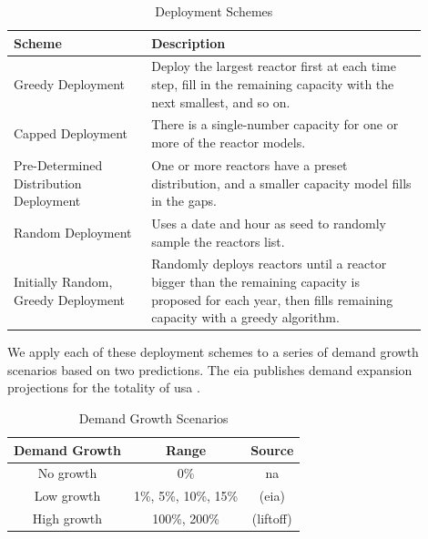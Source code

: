 \begin{table}[htbp]
    \centering
    \caption{Deployment Schemes}
    \label{tab:deployment_schemes}
    \begin{tabular}{p{0.3\linewidth} p{0.6\linewidth}}
        \hline
        \textbf{Scheme} & \textbf{Description} \\
        \hline
        Greedy Deployment & Deploy the largest reactor first at each time step, fill in the remaining capacity with the next smallest, and so on. \\
        \vspace{0.4mm}
        Capped Deployment & There is a single-number capacity for one or more of the reactor models. \\
        \vspace{0.4mm}
        Pre-Determined Distribution Deployment & One or more reactors have a preset distribution, and a smaller capacity model fills in the gaps. \\
        \vspace{0.4mm}
        Random Deployment & Uses a date and hour as seed to randomly sample the reactors list. \\
        \vspace{0.4mm}
        Initially Random, Greedy Deployment & Randomly deploys reactors until a reactor bigger than the remaining capacity is proposed for each year, then fills remaining capacity with a greedy algorithm. \\
        \hline
    \end{tabular}
\end{table}

We apply each of these deployment schemes to a series of demand growth scenarios based on two predictions. The \gls{eia} publishes demand expansion projections for the totality of \gls{usa} .

\begin{table}[htbp]
    \centering
    \caption{Demand Growth Scenarios}
    \label{tab:demand_scenarios}
    \begin{tabular}{c c c}
        \hline
        \textbf{Demand Growth} & \textbf{Range} & \textbf{Source}\\
        \hline
        No growth & 0\% & na\\
        Low growth & 1\%, 5\%, 10\%, 15\% & (eia)\\
        High growth & 100\%, 200\% & (liftoff)\\
        \hline
    \end{tabular}
\end{table}

